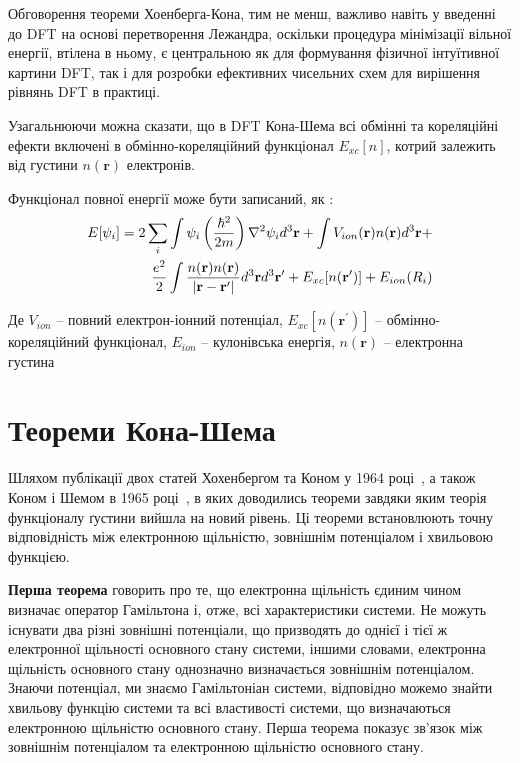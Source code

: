 Обговорення теореми Хоенберга-Кона, тим не менш, важливо навіть у введенні до DFT на основі перетворення Лежандра, оскільки процедура мінімізації вільної енергії, втілена в ньому, є центральною як для формування фізичної інтуїтивної картини DFT, так і для розробки ефективних чисельних схем для вирішення рівнянь DFT в практиці.

Узагальнюючи можна сказати, що в DFT Кона-Шема всі обмінні та кореляційні ефекти включені в обмінно-кореляційний функціонал $E_{xc}[n]$, котрий залежить від густини $n(\textbf{r})$ електронів. 


Функціонал повної енергії може бути записаний, як \cite{KSenergy}:
\begin{eqnarray}
 E[\psi_i] = 2\sum\limits_{i}\int\psi_i\left({{\hbar^2}\over{2m}}\right)\nabla^2\psi_id^3\textbf{r}+\int V_{ion}(\textbf{r})n(\textbf{r})d^3\textbf{r}+\nonumber \\
 {{e^2}\over{2}}\int {{n(\textbf{r})n(\textbf{r})}\over{|\textbf{r}-\textbf{r}^\prime|}}d^3\textbf{r}d^3\textbf{r}^\prime+E_{xc}[n(\textbf{r}^\prime)]+E_{ion}(R_i)
\end{eqnarray}

Де $V_{ion}$ -- повний електрон-іонний потенціал, $E_{xc}[n(\textbf{r}^\prime)]$ -- обмінно-кореляційний функціонал, $E_{ion}$ -- кулонівська енергія, $n(\textbf{r})$ -- електронна густина

\section{Теореми Кона-Шема}
Шляхом публікації двох статей Хохенбергом та Коном у 1964 році~\cite{Hohenberg&Khon}, а також Коном і Шемом в 1965 році~\cite{Khon&Sham}, в яких доводились теореми завдяки яким теорія функціоналу ґустини вийшла на новий рівень. Ці теореми встановлюють точну відповідність між електронною щільністю, зовнішнім потенціалом і хвильовою функцією.

\textbf{Перша теорема} говорить про те, що електронна щільність єдиним чином визначає оператор Гамільтона і, отже, всі характеристики системи.
Не можуть існувати два різні зовнішні потенціали, що призводять до однієї і тієї ж електронної щільності основного стану системи, іншими словами, електронна щільність основного стану однозначно визначається зовнішнім потенціалом.
Знаючи потенціал, ми знаємо Гамільтоніан системи, відповідно можемо знайти хвильову функцію системи та всі властивості системи, що визначаються електронною щільністю основного стану. Перша теорема показує зв'язок між зовнішнім потенціалом та електронною щільністю основного стану.

